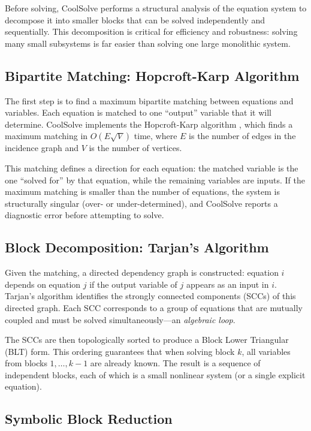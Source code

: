 \documentclass[review,3p]{elsarticle}
\begin{document}
Before solving, CoolSolve performs a structural analysis of the equation system to decompose it into smaller blocks that can be solved independently and sequentially. This decomposition is critical for efficiency and robustness: solving many small subsystems is far easier than solving one large monolithic system.

\subsection{Bipartite Matching: Hopcroft-Karp Algorithm}

The first step is to find a maximum bipartite matching between equations and variables. Each equation is matched to one ``output'' variable that it will determine. CoolSolve implements the Hopcroft-Karp algorithm \cite{HopcroftKarp1973}, which finds a maximum matching in $O(E\sqrt{V})$ time, where $E$ is the number of edges in the incidence graph and $V$ is the number of vertices.

This matching defines a direction for each equation: the matched variable is the one ``solved for'' by that equation, while the remaining variables are inputs. If the maximum matching is smaller than the number of equations, the system is structurally singular (over- or under-determined), and CoolSolve reports a diagnostic error before attempting to solve.

\subsection{Block Decomposition: Tarjan's Algorithm}

Given the matching, a directed dependency graph is constructed: equation $i$ depends on equation $j$ if the output variable of $j$ appears as an input in $i$. Tarjan's algorithm \cite{Tarjan1972} identifies the strongly connected components (SCCs) of this directed graph. Each SCC corresponds to a group of equations that are mutually coupled and must be solved simultaneously---an \emph{algebraic loop}.

The SCCs are then topologically sorted to produce a Block Lower Triangular (BLT) form. This ordering guarantees that when solving block $k$, all variables from blocks $1, \ldots, k-1$ are already known. The result is a sequence of independent blocks, each of which is a small nonlinear system (or a single explicit equation).

\subsection{Symbolic Block Reduction}
\end{document}
